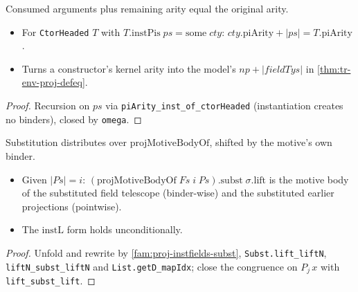 \begin{lemma}
  \label{thm:proj-instpis-piarity}
  \leanok

   Consumed arguments plus remaining arity equal the original arity.
  \begin{itemize}
  \item For \texttt{CtorHeaded} $T$ with $T.\mathrm{instPis}\;ps=\mathrm{some}\;cty$:
        $cty.\mathrm{piArity}+|ps| = T.\mathrm{piArity}$.
  \item Turns a constructor's kernel arity into the model's $np+|fieldTys|$ in
        \ref{thm:tr-env-proj-defeq}.
  \end{itemize}
\end{lemma}
\begin{proof}
  \leanok
   Recursion on $ps$ via \texttt{piArity\_inst\_of\_ctorHeaded} (instantiation creates
  no binders), closed by \texttt{omega}.
\end{proof}

\begin{lemma}
  \label{fam:proj-motivebodyof-subst}
  \leanok

   Substitution distributes over $\mathrm{projMotiveBodyOf}$, shifted by the
  motive's own binder.
  \begin{itemize}
  \item Given $|Ps|=i$: $(\mathrm{projMotiveBodyOf}\;Fs\;i\;Ps).\mathrm{subst}\;\sigma.\mathrm{lift}$
        is the motive body of the substituted field telescope (binder-wise) and the substituted
        earlier projections (pointwise).
  \item The $\mathrm{instL}$ form holds unconditionally.
  \end{itemize}
\end{lemma}
\begin{proof}
  \leanok
   Unfold and rewrite by \ref{fam:proj-instfields-subst}, \texttt{Subst.lift\_liftN},
  \texttt{liftN\_subst\_liftN} and \texttt{List.getD\_mapIdx}; close the congruence on $P_j\,x$
  with \texttt{lift\_subst\_lift}.
\end{proof}

